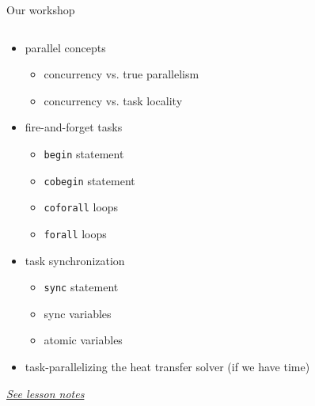 \documentclass[10pt,xcolor=pdftex,dvipsnames,table]{beamer}
\newcommand{\tc}{\textcolor}
\begin{document}
\begin{frame}{Our workshop}
\begin{columns}[]
\begin{block}{}
      {\let\normalsize\footnotesize \normalsize
        \begin{itemize}\setlength{\itemsep}{1mm}
        \item parallel concepts
          {\let\small\scriptsize \small
            \begin{itemize}\setlength{\itemsep}{0.5mm}
            \item concurrency vs. true parallelism
            \item concurrency vs. task locality
          \end{itemize}}
        \item fire-and-forget tasks
          {\let\small\scriptsize \small
            \begin{itemize}\setlength{\itemsep}{0.5mm}
            \item \tc{Mahogany}{\texttt{begin}} statement
            \item \tc{Mahogany}{\texttt{cobegin}} statement
            \item \tc{Mahogany}{\texttt{coforall}} loops
            \item \tc{Mahogany}{\texttt{forall}} loops
          \end{itemize}}
        \item task synchronization
          {\let\small\scriptsize \small
            \begin{itemize}\setlength{\itemsep}{0.5mm}
            \item \tc{Mahogany}{\texttt{sync}} statement
            \item sync variables
            \item atomic variables
          \end{itemize}}
        \item \tc{arsenic}{task-parallelizing the heat transfer solver (if we have time)}
        \end{itemize}}
      \begin{center}
        \href{http://bit.ly/2CDHCUS}{\tc{Mahogany}{\it See lesson notes}}
      \end{center}
    \end{block}
    \begin{block}{}
      \begin{center}

\end{center}
\end{block}
\end{columns}
\end{frame}
\end{document}
